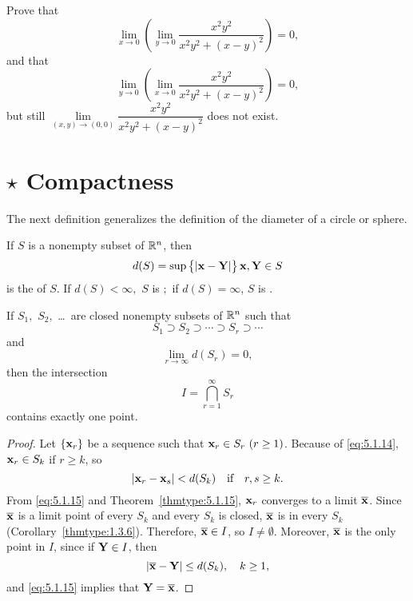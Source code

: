 \begin{multicols}{2}
\begin{problem}
Prove that $$\lim\limits _{x\to 0}\left(\lim\limits _{y\to 0}
\dfrac{x^2y^2}{x^2y^2+(x-y)^2}\right) = 0,$$ and that $$\lim\limits _{y\to
0}\left(\lim\limits _{x\to 0} \dfrac{x^2y^2}{x^2y^2+(x-y)^2}\right)=0,
$$but still  $\lim\limits _{(x,y)\to (0,0)} \dfrac{x^2y^2}{x^2y^2+(x-y)^2}$ does not exist.
\end{problem}

\end{multicols}


\section{$\star$ Compactness}

The next definition generalizes the definition of the diameter of a
circle or sphere.

\begin{df}\label{thmtype:5.1.16}
If $S$ is  a nonempty subset of $\mathbb{R}^n$, then
$$
d(S)=\sup\set{|\mathbf{ x}-\mathbf{ Y}|}{\mathbf{ x},\mathbf{ Y}\in S}
$$
is the  of $S$.
If $d(S)<\infty,$ $S$ is  $;$ if
$d(S)=\infty$, $S$ is .
\end{df}



\begin{thm} \label{thmtype:5.1.17}
If $S_1,$ $S_2,$ \dots\ are closed nonempty subsets of $\mathbb{R}^n$
such that
\begin{equation}\label{eq:5.1.14}
S_1\supset S_2\supset\cdots\supset S_r\supset\cdots
\end{equation}
and
\begin{equation}\label{eq:5.1.15}
\lim\limits_{r\to\infty} d(S_r)=0,
\end{equation}
then the intersection
$$
I=\bigcap^\infty_{r=1}S_r
$$
contains exactly one point$.$
\end{thm}



\begin{proof}
Let
$\{\mathbf{ x}_r\}$ be a sequence such that $\mathbf{ x}_r\in S_r\ (r\ge1)$.
Because of
\eqref{eq:5.1.14}, $\mathbf{ x}_r\in S_k$ if $r\ge k$, so
$$
|\mathbf{ x}_r-\mathbf{ x}_s|<d(S_k)\mbox{\quad if\quad} r, s\ge k.
$$
From \eqref{eq:5.1.15} and Theorem~\ref{thmtype:5.1.15},
$\mathbf{ x}_{r}$
converges to a limit $\overline{\mathbf{ x}}$. Since $\overline{\mathbf{ x}}$ is
a limit point of every $S_k$ and every $S_k$ is closed,
$\overline{\mathbf{ x}}$
is in every $S_k$ (Corollary~\ref{thmtype:1.3.6}).
Therefore, $\overline{\mathbf{ x}}\in I$, so $I\ne
\emptyset$. Moreover, $\overline{\mathbf{ x}}$ is the only point in $I$,
since if $\mathbf{ Y}\in I$, then
$$
|\overline{\mathbf{ x}}-\mathbf{ Y}|\le d(S_k),\quad k\ge1,
$$
and \eqref{eq:5.1.15} implies that $\mathbf{ Y}=\overline{\mathbf{ x}}$.
\end{proof}


